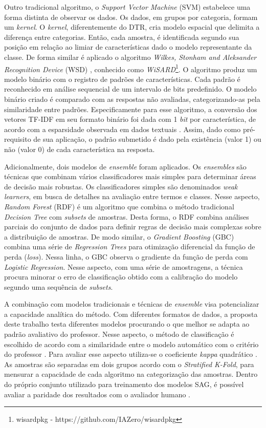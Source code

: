 Outro tradicional algoritmo, o \textit{Support Vector Machine} (SVM) estabelece uma forma distinta de observar os dados. Os dados, em grupos por categoria, formam um \textit{kernel}. O \textit{kernel}, diferentemente do DTR, cria modelo espacial que delimita a diferença entre categorias. Então, cada amostra, é identificada segundo sua posição em relação ao limiar de características dado o modelo representante da classe. De forma similar é aplicado o algoritmo \textit{Wilkes, Stonham and Aleksander Recognition Device} (WSD) \cite{aleksander1984, wisard2020}, conhecido como \textit{WiSARD}\footnote{wisardpkg - https://github.com/IAZero/wisardpkg}. O algoritmo produz um modelo binário com o registro de padrões de características. Cada padrão é reconhecido em análise sequencial de um intervalo de bits predefinido. O modelo binário criado é comparado com as respostas não avaliadas, categorizando-as pela similaridade entre padrões. Especificamente para esse algoritmo, a conversão dos vetores TF-IDF em seu formato binário foi dada com 1 \textit{bit} por característica, de acordo com a esparsidade observada em dados textuais \cite{manning1999}. Assim, dado como pré-requisito de sua aplicação, o padrão submetido é dado pela existência (valor 1) ou não (valor 0) de cada característica na resposta.

Adicionalmente, dois modelos de \textit{ensemble} foram aplicados. Os \textit{ensembles} são técnicas que combinam vários classificadores mais simples para determinar áreas de decisão mais robustas. Os classificadores simples são denominados \textit{weak learners}, em busca de detalhes na avaliação entre termos e classes. Nesse aspecto, \textit{Random Forest} (RDF) é um algoritmo que combina o método tradicional \textit{Decision Tree} com \textit{subsets} de amostras. Desta forma, o RDF combina análises parciais do conjunto de dados para definir regras de decisão mais complexas sobre a distribuição de amostras. De modo similar, o \textit{Gradient Boosting} (GBC) combina uma série de \textit{Regression Trees} para otimização diferencial da função de perda (\textit{loss}). Nessa linha, o GBC observa o gradiente da função de perda com \textit{Logistic Regression}. Nesse aspecto, com uma série de amostragens, a técnica procura minorar o erro de classificação obtido com a calibração do modelo segundo uma sequência de \textit{subsets}. 

A combinação com modelos tradicionais e técnicas de \textit{ensemble} visa potencializar a capacidade analítica do método. Com diferentes formatos de dados, a proposta deste trabalho testa diferentes modelos procurando o que melhor se adapta ao padrão avaliativo do professor. Nesse aspecto, o método de classificação é escolhido de acordo com a similaridade entre o modelo automático com o critério do professor \cite{pado2021}. Para avaliar esse aspecto utiliza-se o coeficiente \textit{kappa} quadrático \cite{cohen1960}. As amostras são separadas em dois grupos acordo com o \textit{Stratified K-Fold}, para mensurar a capacidade de cada algoritmo na categorização das amostras. Dentro do próprio conjunto utilizado para treinamento dos modelos SAG, é possível avaliar a paridade dos resultados com o avaliador humano \cite{artstein2008}.

